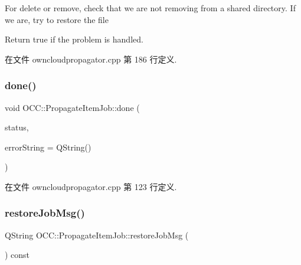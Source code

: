 For delete or remove, check that we are not removing from a shared directory. If we are, try to restore the file

Return true if the problem is handled. 

在文件 owncloudpropagator.\+cpp 第 186 行定义.

\mbox{\label{class_o_c_c_1_1_propagate_item_job_a0b9d2d0dca6a2ea928346e9615c9da74}} 
\subsubsection{\texorpdfstring{done()}{done()}}
{\footnotesize\ttfamily void O\+C\+C\+::\+Propagate\+Item\+Job\+::done (\begin{DoxyParamCaption}\item[{\hyperlink{class_o_c_c_1_1_sync_file_item_a149ade86eddd9661587bfbc9bcbca408}{Sync\+File\+Item\+::\+Status}}]{status,  }\item[{const Q\+String \&}]{error\+String = {\ttfamily QString()} }\end{DoxyParamCaption})\hspace{0.3cm}{\ttfamily [protected]}}



在文件 owncloudpropagator.\+cpp 第 123 行定义.

\mbox{\label{class_o_c_c_1_1_propagate_item_job_ac87c3a80a55803c1d54f95c31ab8c4d2}} 
\subsubsection{\texorpdfstring{restore\+Job\+Msg()}{restoreJobMsg()}}
{\footnotesize\ttfamily Q\+String O\+C\+C\+::\+Propagate\+Item\+Job\+::restore\+Job\+Msg (\begin{DoxyParamCaption}{ }\end{DoxyParamCaption}) const\hspace{0.3cm}{\ttfamily [protected]}}



